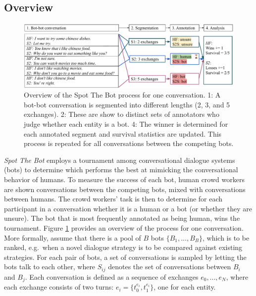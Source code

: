 \documentclass[11pt,a4paper]{article}
\begin{document}
\subsection{Overview}
\label{sec:setting}
\begin{figure}
    \centering
     \includegraphics[scale=0.5]{figures/Spot the bot - annotation example - sketch2.pdf}
    \caption{Overview of the Spot The Bot process for one conversation. 1: A bot-bot conversation is segmented into different lengths (2, 3, and 5 exchanges). 2: These are show to distinct sets of annotators who judge whether each entity is a bot. 4: The winner is determined for each annotated segment and survival statistics are updated. This process is repeated for all conversations between the competing bots.}
    \label{fig:example}
\end{figure}
\emph{Spot The Bot} employs a tournament among conversational dialogue systems (bots) to determine which performs the best at mimicking the conversational behavior of humans. To measure the success of each bot, human crowd workers are shown conversations between the competing bots, mixed with conversations between humans. The crowd workers' task is then to determine for each participant in a conversation whether it is a human or a bot (or whether they are unsure). The bot that is most frequently annotated as being human, wins the tournament. Figure \ref{fig:example} provides an overview of the process for one conversation. \\
More formally, assume that there is a pool of $B$ bots $\{B_1, ..., B_B\}$, which is to be ranked, e.g.\ when a novel dialogue strategy is to be compared against existing strategies. For each pair of bots, a set of conversations is sampled by letting the bots talk to each other, where $S_{ij}$ denotes the set of conversations between $B_i$ and $B_j$. Each conversation is defined as a sequence of exchanges $e_0, ..., e_N$, where each exchange consists of two turns: $e_i = \{t_0^{e_i}, t_1^{e_i}\}$, one for each entity. %
\end{document}
